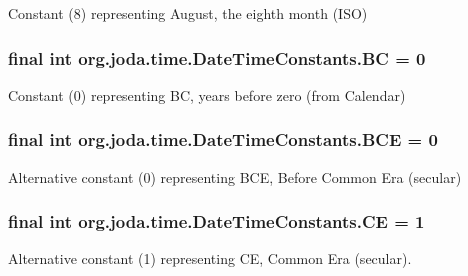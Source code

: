 Constant (8) representing August, the eighth month (I\-S\-O) \hypertarget{classorg_1_1joda_1_1time_1_1_date_time_constants_ac3470e8c39548891cf8933bb9acfc9d1}{
\subsubsection[{B\-C}]{\setlength{\rightskip}{0pt plus 5cm}final int org.\-joda.\-time.\-Date\-Time\-Constants.\-B\-C = 0\hspace{0.3cm}{\ttfamily [static]}}}\label{classorg_1_1joda_1_1time_1_1_date_time_constants_ac3470e8c39548891cf8933bb9acfc9d1}
Constant (0) representing B\-C, years before zero (from Calendar) \hypertarget{classorg_1_1joda_1_1time_1_1_date_time_constants_a224de2adaa34c7641411c402b004f131}{
\subsubsection[{B\-C\-E}]{\setlength{\rightskip}{0pt plus 5cm}final int org.\-joda.\-time.\-Date\-Time\-Constants.\-B\-C\-E = 0\hspace{0.3cm}{\ttfamily [static]}}}\label{classorg_1_1joda_1_1time_1_1_date_time_constants_a224de2adaa34c7641411c402b004f131}
Alternative constant (0) representing B\-C\-E, Before Common Era (secular) \hypertarget{classorg_1_1joda_1_1time_1_1_date_time_constants_aacd9ad6e2964b143878d155f86db83bd}{
\subsubsection[{C\-E}]{\setlength{\rightskip}{0pt plus 5cm}final int org.\-joda.\-time.\-Date\-Time\-Constants.\-C\-E = 1\hspace{0.3cm}{\ttfamily [static]}}}\label{classorg_1_1joda_1_1time_1_1_date_time_constants_aacd9ad6e2964b143878d155f86db83bd}
Alternative constant (1) representing C\-E, Common Era (secular). 

